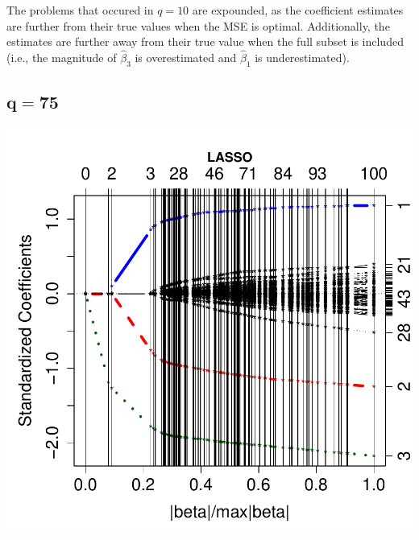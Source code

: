 \documentclass[a4paper]{article}
\begin{document}
The problems that occured in $q=10$ are expounded, as the coefficient estimates
are further from their true values when the MSE is optimal.  Additionally, the
estimates are further away from their true value when the full subset is
included (i.e., the magnitude of $\hat{\beta}_3$ is overestimated and $\hat{\beta}_1$
is underestimated).

\subsection{$\mathbf{q=75}$}
\vspace{-15pt}
\begin{minipage}[c]{0.6\linewidth}
\includegraphics{h4_ind-009}
\end{minipage}
\hspace{-50pt}
\end{document}
